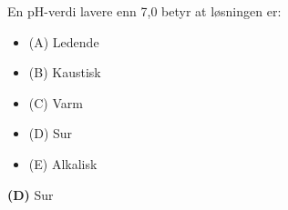 

En pH-verdi lavere enn 7,0 betyr at løsningen er:

\begin{itemize}
\item{(A)} Ledende
\vskip 5pt 
\item{(B)} Kaustisk
\vskip 5pt 
\item{(C)} Varm
\vskip 5pt 
\item{(D)} Sur
\vskip 5pt 
\item{(E)} Alkalisk
\end{itemize}







{\bf (D)} Sur
 







